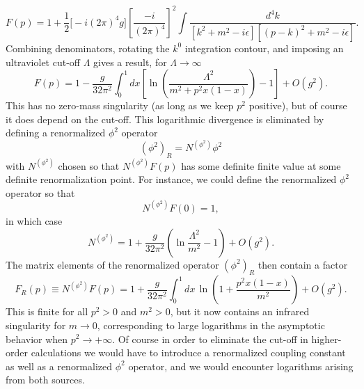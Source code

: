 \begin{equation}
 F(p)=1+\frac{1}{2}\bigl[-i(2\pi)^4g\bigr]
 \left[\frac{-i}{(2\pi)^4}\right]^2
 \int\frac{d^4k}{[k^2+m^2-i\epsilon][(p-k)^2+m^2-i\epsilon]} .
 \tag{18.1.8}
 \label{eq:18.1.8}
\end{equation}
Combining denominators, rotating the $k^0$ integration contour, and imposing
an ultraviolet cut-off $\Lambda$ gives a result, for $\Lambda\to\infty$
\begin{equation}
 F(p)=1-\frac{g}{32\pi^2}\int_0^1dx
 \left[\ln\left(\frac{\Lambda^2}{m^2+p^2x(1-x)}\right)-1\right]
 +O(g^2) .
 \tag{18.1.9}
 \label{eq:18.1.9}
\end{equation}
This has no zero-mass singularity (as long as we keep $p^2$ positive), but of
course it does depend on the cut-off. This logarithmic divergence is
eliminated by defining a renormalized $\phi^2$ operator
\begin{equation}
 (\phi^2)_R=N^{(\phi^2)}\phi^2
 \tag{18.1.10}
 \label{eq:18.1.10}
\end{equation}
with $N^{(\phi^2)}$ chosen so that $N^{(\phi^2)}F(p)$ has some definite finite
value at some definite renormalization point. For instance, we could define
the renormalized $\phi^2$ operator so that
\begin{equation}
 N^{(\phi^2)}F(0)=1 ,
 \tag{18.1.11}
 \label{eq:18.1.11}
\end{equation}
in which case
\begin{equation}
 N^{(\phi^2)}=1+\frac{g}{32\pi^2}
 \left(\ln\frac{\Lambda^2}{m^2}-1\right)+O(g^2) .
 \tag{18.1.12}
 \label{eq:18.1.12}
\end{equation}
The matrix elements of the renormalized operator $(\phi^2)_R$ then contain a
factor
\begin{equation}
 F_R(p)\equiv N^{(\phi^2)}F(p)
 =1+\frac{g}{32\pi^2}\int_0^1dx\,
 \ln\left(1+\frac{p^2x(1-x)}{m^2}\right)+O(g^2) .
 \tag{18.1.13}
 \label{eq:18.1.13}
\end{equation}
This is finite for all $p^2>0$ and $m^2>0$, but it now contains an infrared
singularity for $m\to0$, corresponding to large logarithms in the asymptotic
behavior when $p^2\to+\infty$. Of course in order to eliminate the cut-off in
higher-order calculations we would have to introduce a renormalized coupling
constant as well as a renormalized $\phi^2$ operator, and we would encounter
logarithms arising from both sources.

